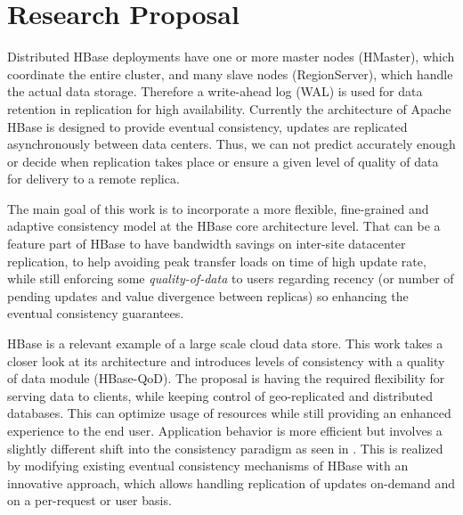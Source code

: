 \section{Research Proposal}
Distributed HBase deployments have one or more master nodes (HMaster), which coordinate the entire cluster, and many slave nodes (RegionServer), which handle the actual data storage.  Therefore a write-ahead log (WAL) is used for data retention in replication for high availability. Currently the architecture of Apache HBase is designed to provide eventual consistency, updates are replicated asynchronously between data centers. Thus, we can not predict accurately enough or decide when replication takes place or ensure a given level of quality of data for delivery to a remote replica.

The main goal of this work is to incorporate a more flexible, fine-grained and adaptive consistency model at the HBase core architecture level. That can be a feature part of HBase to have bandwidth savings on inter-site datacenter replication, to help avoiding peak transfer loads on time of high update rate, while still enforcing some \emph{quality-of-data} to users regarding recency (or number of pending updates and value divergence between replicas) so enhancing the eventual consistency guarantees.

HBase is a relevant example of a large scale cloud data store. This work takes a closer look at its architecture and introduces levels of consistency with a quality of data module (HBase-QoD). The proposal is having the required flexibility for serving data to clients, while keeping control of geo-replicated and distributed databases. This can optimize usage of resources while still providing an enhanced experience to the end user. Application behavior is more efficient but involves a slightly different shift into the consistency paradigm as seen in \cite{Cooper:2008}. This is realized by modifying existing eventual consistency mechanisms of HBase with an innovative approach, which allows handling replication of updates on-demand and on a per-request or user basis.



